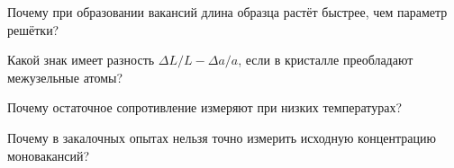 \begin{proverka}
\item Почему при образовании вакансий длина образца растёт быстрее, чем
параметр решётки?
\item Какой знак имеет разность $\Delta L/L-\Delta a/a$, если в кристалле
преобладают межузельные атомы?
\item Почему остаточное сопротивление измеряют при низких температурах?
\item Почему в закалочных опытах нельзя точно измерить исходную
концентрацию моновакансий?
\end{proverka}
